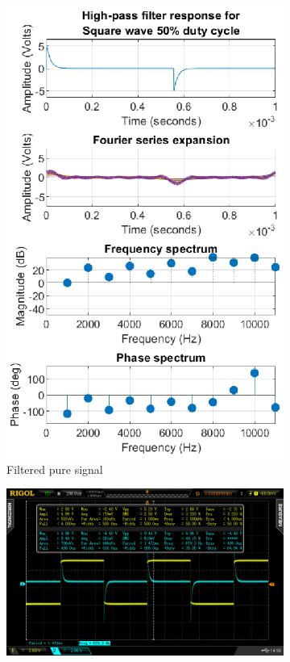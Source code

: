 \documentclass[notitlepage, a4paper, 11pt]{article}
\begin{document}
\begin{figure}[H]
\begin{subfigure}[][][t]{0.26\textwidth}
			\includegraphics[width=\textwidth]{../Matlab/img/RCHPsqr50}
			\caption{Filtered pure signal}
		\end{subfigure}
		\hfill
		\begin{subfigure}[][][t]{0.45\textwidth}
			\includegraphics[width=\textwidth, trim=85 50 112 45, clip]{../img/osc/DS2_QuickPrint7.png}

\end{subfigure}
\end{figure}
\end{document}
